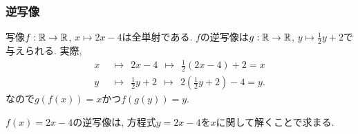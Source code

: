 

\begin{frame}
\frametitle{逆写像}



\begin{Ex}
写像$f:\mathbb{R} \rightarrow \mathbb{R}$, $x \mapsto 2x-4$は全単射である. 
$f$の逆写像は$g:\mathbb{R} \rightarrow \mathbb{R}$, $y \mapsto \frac{1}{2}y+2$で与えられる. 
実際, 
\begin{align*}
x & \ \ \mapsto \ \ 2x-4 \ \ \mapsto \ \ \frac{1}{2}(2x-4)+2=x \\
y & \ \ \mapsto \ \ \frac{1}{2}y+2 \ \ \mapsto \ \ 2(\frac{1}{2}y+2)-4 = y. 
\end{align*}
なので$g(f(x))=x$かつ$f(g(y))=y$. 
\end{Ex}
$f(x)=2x-4$の逆写像は, 方程式$y=2x-4$を$x$に関して解くことで求まる. 


\end{frame}








